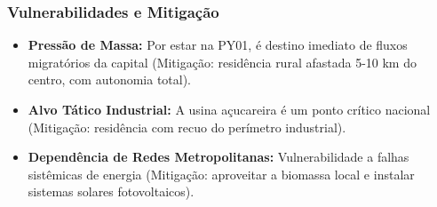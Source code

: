 \subsubsection{Vulnerabilidades e
Mitigação}

\begin{itemize}
\tightlist
\item
  \textbf{Pressão de Massa:} Por estar na PY01, é destino imediato de
  fluxos migratórios da capital (Mitigação: residência rural afastada
  5-10 km do centro, com autonomia total).
\item
  \textbf{Alvo Tático Industrial:} A usina açucareira é um ponto crítico
  nacional (Mitigação: residência com recuo do perímetro industrial).
\item
  \textbf{Dependência de Redes Metropolitanas:} Vulnerabilidade a falhas
  sistêmicas de energia (Mitigação: aproveitar a biomassa local e
  instalar sistemas solares fotovoltaicos).
\end{itemize}

